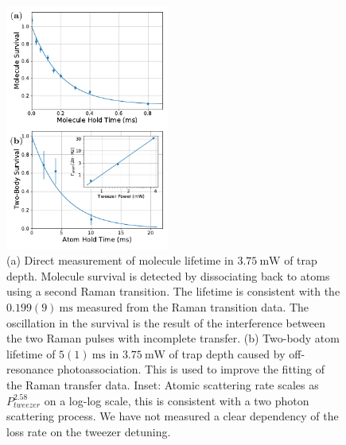 \documentclass[aps,prl,twocolumn,10pt,superscriptaddress]{revtex4-1}
\begin{document}
\begin{figure}[t!]
  \includegraphics[width=0.48\textwidth]{fig3.pdf}
  \caption{
    (a) Direct measurement of molecule lifetime in $3.75~\mathrm{mW}$ of trap depth.
    Molecule survival is detected by dissociating back to atoms using a second Raman transition.
    The lifetime is consistent with the $0.199(9)~\mathrm{ms}$
    measured from the Raman transition data.
    The oscillation in the survival is the result of the interference
    between the two Raman pulses with incomplete transfer.
    (b) Two-body atom lifetime of $5(1)~\mathrm{ms}$
    in $3.75~\mathrm{mW}$ of trap depth caused by off-resonance photoassociation.
    This is used to improve the fitting of the Raman transfer data.
    Inset: Atomic scattering rate scales as $P_{tweezer}^{2.58}$ on a log-log scale,
    this is consistent with a two photon scattering process.
    We have not measured a clear dependency of the loss rate on the tweezer detuning.
    \label{f-lifetime}}
\end{figure}

\end{document}
